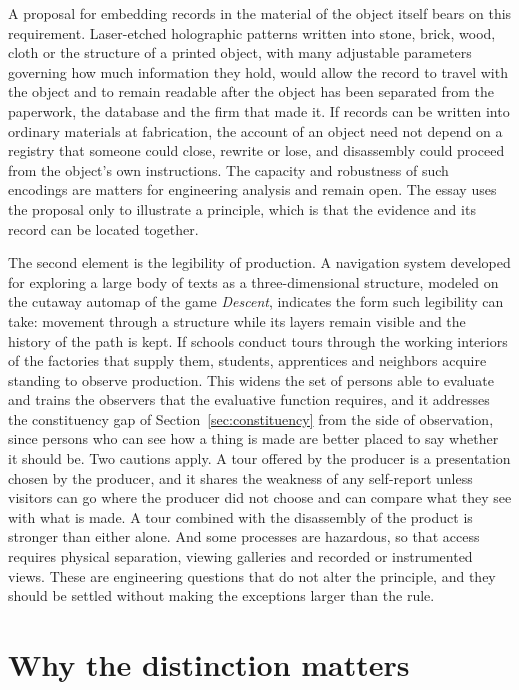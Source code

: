\documentclass[12pt]{article}
\theoremstyle{definition}
\begin{document}
A proposal for embedding records in the material of the object itself bears on this requirement. Laser-etched holographic patterns written into stone, brick, wood, cloth or the structure of a printed object, with many adjustable parameters governing how much information they hold, would allow the record to travel with the object and to remain readable after the object has been separated from the paperwork, the database and the firm that made it. If records can be written into ordinary materials at fabrication, the account of an object need not depend on a registry that someone could close, rewrite or lose, and disassembly could proceed from the object's own instructions. The capacity and robustness of such encodings are matters for engineering analysis and remain open. The essay uses the proposal only to illustrate a principle, which is that the evidence and its record can be located together.

The second element is the legibility of production. A navigation system developed for exploring a large body of texts as a three-dimensional structure, modeled on the cutaway automap of the game \emph{Descent}, indicates the form such legibility can take: movement through a structure while its layers remain visible and the history of the path is kept. If schools conduct tours through the working interiors of the factories that supply them, students, apprentices and neighbors acquire standing to observe production. This widens the set of persons able to evaluate and trains the observers that the evaluative function requires, and it addresses the constituency gap of Section~\ref{sec:constituency} from the side of observation, since persons who can see how a thing is made are better placed to say whether it should be. Two cautions apply. A tour offered by the producer is a presentation chosen by the producer, and it shares the weakness of any self-report unless visitors can go where the producer did not choose and can compare what they see with what is made. A tour combined with the disassembly of the product is stronger than either alone. And some processes are hazardous, so that access requires physical separation, viewing galleries and recorded or instrumented views. These are engineering questions that do not alter the principle, and they should be settled without making the exceptions larger than the rule.

\section{Why the distinction matters}
\end{document}
